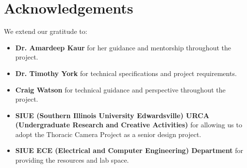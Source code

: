 \section{Acknowledgements}
We extend our gratitude to:
\begin{itemize}
    \item \textbf{Dr. Amardeep Kaur} for her guidance and mentorship throughout the project.
    \item \textbf{Dr. Timothy York} for technical specifications and project requirements.
    \item \textbf{Craig Watson} for technical guidance and perspective throughout the project.
    \item \textbf{SIUE (Southern Illinois University Edwardsville) URCA (Undergraduate Research and Creative Activities)} for allowing us to adopt the Thoracic Camera Project as a senior design project.
    \item \textbf{SIUE ECE (Electrical and Computer Engineering) Department} for providing the resources and lab space.
\end{itemize}
